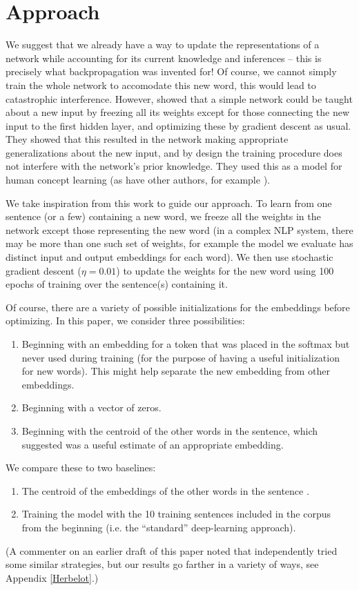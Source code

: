 \documentclass{article}
\begin{document}
\section{Approach}
We suggest that we already have a way to update the representations of a network while accounting for its current knowledge and inferences -- this is precisely what backpropagation was invented for! Of course, we cannot simply train the whole network to accomodate this new word, this would lead to catastrophic interference. However, \citet{Rumelhart1993} showed that a simple network could be taught about a new input by freezing all its weights except for those connecting the new input to the first hidden layer, and optimizing these by gradient descent as usual. They showed that this resulted in the network making appropriate generalizations about the new input, and by design the training procedure does not interfere with the network's prior knowledge. They used this as a model for human concept learning (as have other authors, for example \citet{Rogers2004}). \par
We take inspiration from this work to guide our approach. To learn from one sentence (or a few) containing a new word, we freeze all the weights in the network except those representing the new word (in a complex NLP system, there may be more than one such set of weights, for example the model we evaluate has distinct input and output embeddings for each word). We then use stochastic gradient descent (\(\eta = 0.01\)) to update the weights for the new word using 100 epochs of training over the sentence(s) containing it. \par
Of course, there are a variety of possible initializations for the embeddings before optimizing. In this paper, we consider three possibilities: 
\vspace{-0.5em}
\begin{enumerate}
\setlength\itemsep{0em}
\item Beginning with an embedding for a token that was placed in the softmax but never used during training (for the purpose of having a useful initialization for new words). This might help separate the new embedding from other embeddings. 
\item Beginning with a vector of zeros.
\item Beginning with the centroid of the other words in the sentence, which \citet{Lazaridou2017} suggested was a useful estimate of an appropriate embedding.
\end{enumerate}
\vspace{-0.5em}
We compare these to two baselines:
\vspace{-0.5em}
\begin{enumerate}
\setlength\itemsep{0em}
\item The centroid of the embeddings of the other words in the sentence \citet{Lazaridou2017}. 
\item Training the model with the 10 training sentences included in the corpus from the beginning (i.e. the ``standard'' deep-learning approach).
\end{enumerate}
(A commenter on an earlier draft of this paper noted that \cite{Herbelot2017} independently tried some similar strategies, but our results go farther in a variety of ways, see Appendix \ref{Herbelot}.)
\end{document}
